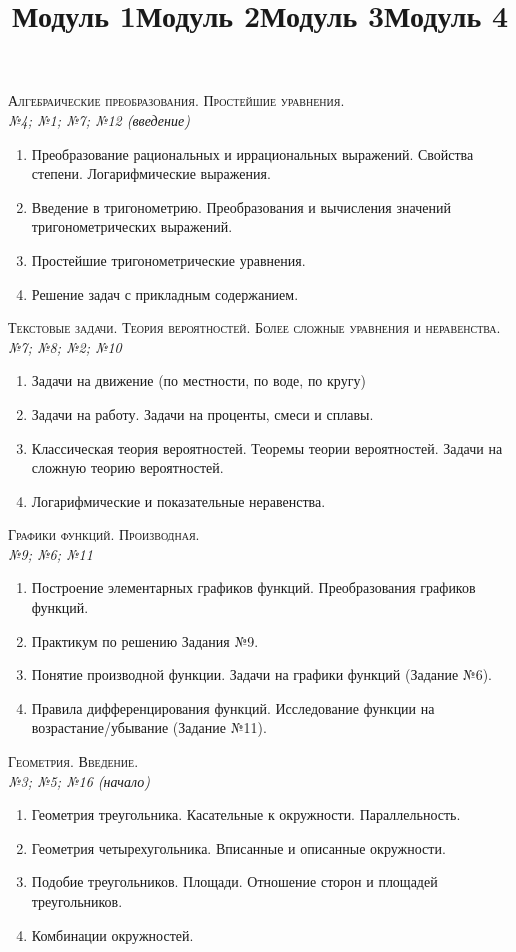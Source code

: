\documentclass[12pt, a4paper]{article}
\begin{document}
	
\center
\title{Модуль 1}
\textsc{Алгебраические преобразования. Простейшие уравнения.}\\[0.5em]
\textit{№4; №1; №7; №12 (введение)}
\begin{enumerate}[label=\textbf{\arabic*})]
	\item Преобразование рациональных и иррациональных выражений. Свойства степени. Логарифмические выражения.
	\item Введение в тригонометрию. Преобразования и вычисления значений тригонометрических выражений.
	\item Простейшие тригонометрические уравнения.
	\item Решение задач с прикладным содержанием.
\end{enumerate}
\title{Модуль 2}
\textsc{Текстовые задачи. Теория вероятностей. Более сложные уравнения и неравенства.}\\[0.5em]
\textit{№7; №8; №2; №10}
\begin{enumerate}[label=\textbf{\arabic*})]
	\item Задачи на движение (по местности, по воде, по кругу)
	\item Задачи на работу. Задачи на проценты, смеси и сплавы.
	\item Классическая теория вероятностей. Теоремы теории вероятностей. Задачи на сложную теорию вероятностей.
	\item Логарифмические и показательные неравенства.
\end{enumerate}
\title{Модуль 3}
\textsc{Графики функций. Производная.}\\[0.5em]
\textit{№9; №6; №11}
\begin{enumerate}[label=\textbf{\arabic*})]
	\item Построение элементарных графиков функций. Преобразования графиков функций.
	\item Практикум по решению Задания №9.
	\item Понятие производной функции. Задачи на графики функций (Задание №6).
	\item Правила дифференцирования функций. Исследование функции на возрастание/убывание (Задание №11).
\end{enumerate}
\title{Модуль 4}
\textsc{Геометрия. Введение.}\\[0.5em]
\textit{№3; №5; №16 (начало)}
\begin{enumerate}[label=\textbf{\arabic*})]
	\item Геометрия треугольника. Касательные к окружности. Параллельность.
	\item Геометрия четырехугольника. Вписанные и описанные окружности.
	\item Подобие треугольников. Площади. Отношение сторон и площадей треугольников.
	\item Комбинации окружностей.
\end{enumerate}
\end{document}
